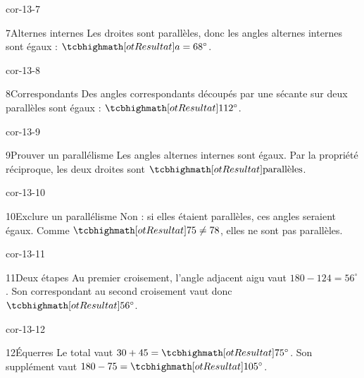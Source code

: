 \begin{blocLivre}{cor-13-7}\begin{corrige}{7}{Alternes internes}
Les droites sont parallèles, donc les angles alternes internes sont égaux : $\res{a=68^\circ}$.
\label{fig-cor-13-7}
\end{corrige}\end{blocLivre}
\begin{blocLivre}{cor-13-8}\begin{corrige}{8}{Correspondants}
Des angles correspondants découpés par une sécante sur deux parallèles sont égaux : $\res{112^\circ}$.
\label{fig-cor-13-8}
\end{corrige}\end{blocLivre}
\begin{blocLivre}{cor-13-9}\begin{corrige}{9}{Prouver un parallélisme}
Les angles alternes internes sont égaux. Par la propriété réciproque, les deux droites sont $\res{\text{parallèles}}$.
\label{fig-cor-13-9}
\end{corrige}\end{blocLivre}
\begin{blocLivre}{cor-13-10}\begin{corrige}{10}{Exclure un parallélisme}
Non : si elles étaient parallèles, ces angles seraient égaux. Comme $\res{75\ne78}$, elles ne sont pas parallèles.
\label{fig-cor-13-10}
\end{corrige}\end{blocLivre}
\begin{blocLivre}{cor-13-11}\begin{corrige}{11}{Deux étapes}
Au premier croisement, l’angle adjacent aigu vaut $180-124=56^\circ$. Son correspondant au second croisement vaut donc $\res{56^\circ}$.
\label{fig-cor-13-11}
\end{corrige}\end{blocLivre}
\begin{blocLivre}{cor-13-12}\begin{corrige}{12}{Équerres}
Le total vaut $30+45=\res{75^\circ}$. Son supplément vaut $180-75=\res{105^\circ}$.
\label{fig-cor-13-12}
\end{corrige}\end{blocLivre}
